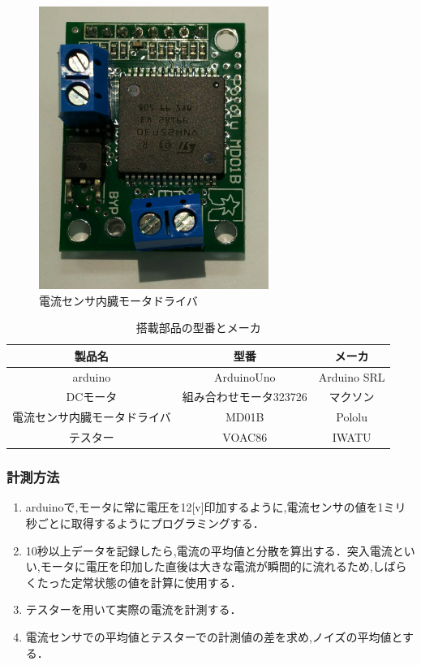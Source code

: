\begin{figure}[H]
 \begin{center}
    \includegraphics[width=75mm]{img/currentDriver.JPG}
    \end{center}
  \caption{電流センサ内臓モータドライバ}
 \label{fig:currentDriver}
\end{figure}

\begin{table}[H]
 \begin{center}
  \caption{搭載部品の型番とメーカ}
  \begin{tabular}[htbp]{|c|c|c|}
   \hline
   製品名&型番&メーカ \\
   \hline
   arduino&ArduinoUno&Arduino SRL\\
   \hline
   DCモータ&組み合わせモータ323726&マクソン\\
   \hline
   電流センサ内臓モータドライバ&MD01B&Pololu\\
   \hline
   テスター&VOAC86&IWATU\\
   \hline
  \end{tabular}
  \label{tab:partsCurrent}
 \end{center}
\end{table}

\subsubsection{計測方法}
\begin{enumerate}
\renewcommand{\labelenumi}{\arabic{enumi})．}
\item arduinoで,モータに常に電圧を12[v]印加するように,電流センサの値を1ミリ秒ごとに取得するようにプログラミングする．
\item 10秒以上データを記録したら,電流の平均値と分散を算出する．突入電流といい,モータに電圧を印加した直後は大きな電流が瞬間的に流れるため,しばらくたった定常状態の値を計算に使用する．
\item テスターを用いて実際の電流を計測する．
\item 電流センサでの平均値とテスターでの計測値の差を求め,ノイズの平均値とする．
\end{enumerate}


